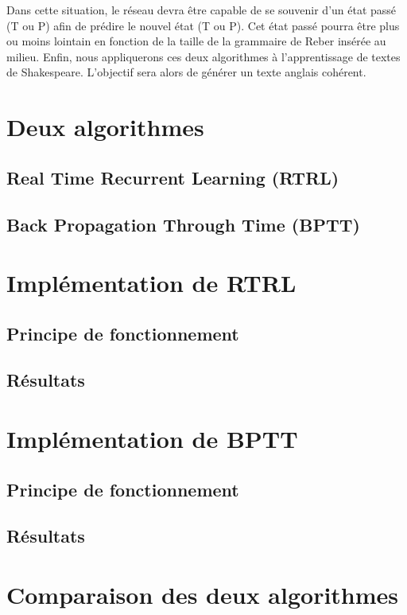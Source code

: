 \documentclass{report}
\begin{document}
Dans cette situation, le réseau devra être capable de se souvenir d'un état passé (T ou P) afin de prédire le nouvel état (T ou P). Cet état passé pourra être plus ou moins lointain en fonction de la taille de la grammaire de Reber insérée au milieu. 
\bigbreak
\bigbreak
Enfin, nous appliquerons ces deux algorithmes à l'apprentissage de textes de Shakespeare. L'objectif sera alors de générer un texte anglais cohérent.
\section{Deux algorithmes}
\subsection{Real Time Recurrent Learning (RTRL)}
\subsection{Back Propagation Through Time (BPTT)}
\section{Implémentation de RTRL}
\subsection{Principe de fonctionnement}
\subsection{Résultats}
\section{Implémentation de BPTT}
\subsection{Principe de fonctionnement}
\subsection{Résultats}
\section{Comparaison des deux algorithmes}
\end{document}
